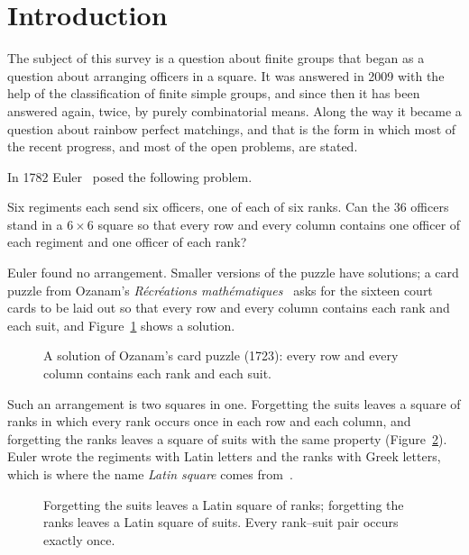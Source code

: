 \section{Introduction}\label{sec:intro}

The subject of this survey is a question about finite groups that began as a question about arranging officers in a square. It was answered in 2009 with the help of the classification of finite simple groups, and since then it has been answered again, twice, by purely combinatorial means. Along the way it became a question about rainbow perfect matchings, and that is the form in which most of the recent progress, and most of the open problems, are stated.


In 1782 Euler~\cite{eul1782} posed the following problem.

\begin{problem}[Euler, 1782]\label{prob:euler}
Six regiments each send six officers, one of each of six ranks. Can the $36$ officers stand in a $6\times6$ square so that every row and every column contains one officer of each regiment and one officer of each rank?
\end{problem}

Euler found no arrangement. Smaller versions of the puzzle have solutions; a card puzzle from Ozanam's \emph{R\'ecr\'eations math\'ematiques}~\cite{oza1723} asks for the sixteen court cards to be laid out so that every row and every column contains each rank and each suit, and Figure~\ref{fig:cards} shows a solution.

\begin{figure}[ht]
\centering

\caption{A solution of Ozanam's card puzzle (1723): every row and every column contains each rank and each suit.}
\label{fig:cards}
\end{figure}

Such an arrangement is two squares in one. Forgetting the suits leaves a square of ranks in which every rank occurs once in each row and each column, and forgetting the ranks leaves a square of suits with the same property (Figure~\ref{fig:card-split}). Euler wrote the regiments with Latin letters and the ranks with Greek letters, which is where the name \emph{Latin square} comes from~\cite{mon24}.

\begin{figure}[ht]
\centering

\caption{Forgetting the suits leaves a Latin square of ranks; forgetting the ranks leaves a Latin square of suits. Every rank--suit pair occurs exactly once.}
\label{fig:card-split}
\end{figure}

